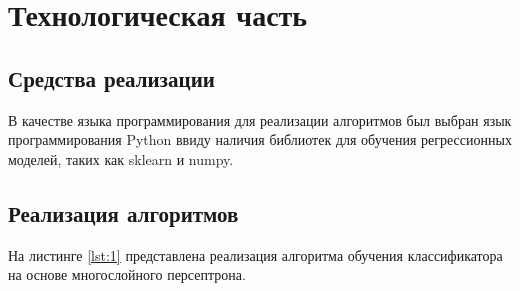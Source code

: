 \chapter{Технологическая часть}

\section{Средства реализации}

В качестве языка программирования для реализации алгоритмов был выбран язык программирования Python ввиду наличия библиотек для обучения регрессионных моделей, таких как sklearn и numpy.

\section{Реализация алгоритмов}

На листинге \ref{lst:1} представлена реализация алгоритма обучения классификатора на основе многослойного персептрона.

